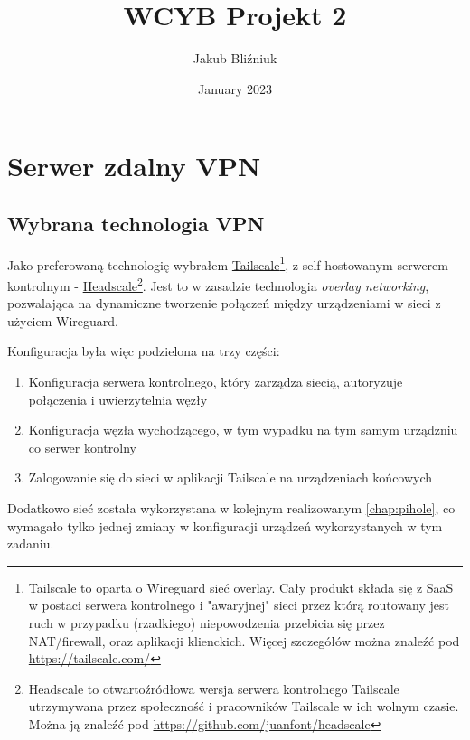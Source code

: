 \documentclass{report}
\title{WCYB Projekt 2}
\author{Jakub Bliźniuk}
\date{January 2023}
\numberwithin{equation}{section}
\begin{document}
\pagestyle{fancy}
\fancyfoot{}
\fancyfoot[C]{\thepage}

\begin{titlepage}
    \vfill
    \maketitle
    \thispagestyle{fancy}
\end{titlepage}
\tableofcontents
\thispagestyle{fancy}
\setcounter{chapter}{4}
\chapter{Serwer zdalny VPN}
\label{chap:vpn}
\section{Wybrana technologia VPN}
Jako preferowaną technologię wybrałem \href{https://tailscale.com}{Tailscale}\footnote{Tailscale to oparta o Wireguard sieć overlay. Cały produkt składa się z SaaS w postaci serwera kontrolnego i "awaryjnej" sieci przez którą routowany jest ruch w przypadku (rzadkiego) niepowodzenia przebicia się przez NAT/firewall, oraz aplikacji klienckich. Więcej szczegółów można znaleźć pod \url{https://tailscale.com/}}, z self-hostowanym serwerem kontrolnym - \href{https://github.com/juanfont/headscale}{Headscale}\footnote{Headscale to otwartoźródłowa wersja serwera kontrolnego Tailscale utrzymywana przez społeczność i pracowników Tailscale w ich wolnym czasie. Można ją znaleźć pod \url{https://github.com/juanfont/headscale}}. Jest to w zasadzie technologia \textit{overlay networking}, pozwalająca na dynamiczne tworzenie połączeń między urządzeniami w sieci z użyciem Wireguard.

Konfiguracja była więc podzielona na trzy części:
\begin{enumerate}
    \item Konfiguracja serwera kontrolnego, który zarządza siecią, autoryzuje połączenia i uwierzytelnia węzły
    \item Konfiguracja węzła wychodzącego, w tym wypadku na tym samym urządzniu co serwer kontrolny
    \item Zalogowanie się do sieci w aplikacji Tailscale na urządzeniach końcowych
\end{enumerate}

Dodatkowo sieć została wykorzystana w kolejnym realizowanym \autoref{chap:pihole}, co wymagało tylko jednej zmiany w konfiguracji urządzeń wykorzystanych w tym zadaniu.
\end{document}
